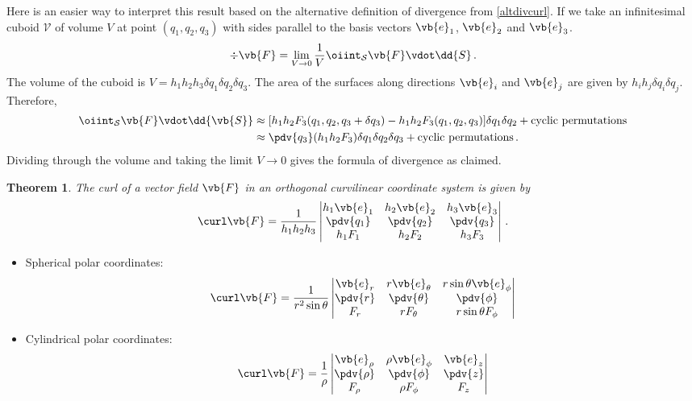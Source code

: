 \documentclass{article}
\theoremstyle{plain}\theoremheaderfont{\normalfont\itshape}\theorembodyfont{\rmfamily}\theoremseparator{.}\newtheorem*{rem}{Remark}\newtheorem*{ex}{Example}\newtheorem*{proof}{Proof}\newtheorem*{altp}{Alternative proof}
\theoremstyle{plain}\theoremheaderfont{\normalfont\bfseries}\theorembodyfont{\rmfamily}\theoremseparator{.}\newtheorem{thm}{Theorem}[section]\newtheorem{lem}[thm]{Lemma}\newtheorem{prop}[thm]{Proposition}\newtheorem*{cor}{Corollary}\newtheorem{defn}[thm]{Definition}\newtheorem{clm}[thm]{Claim}\newtheorem{clminproof}{Claim}
\theoremstyle{break}\theoremheaderfont{\normalfont\itshape}\theorembodyfont{\rmfamily}\theoremseparator{.\medskip}\newtheorem*{proofskip}{Proof}\newtheorem*{exs}{Examples}\newtheorem*{rems}{Remarks}
\theoremstyle{break}\theoremheaderfont{\normalfont\bfseries}\theorembodyfont{\rmfamily}\theoremseparator{.\medskip}\newtheorem{lemskip}[thm]{Lemma}\newtheorem{defnskip}[thm]{Definition}\newtheorem{propskip}[thm]{Proposition}\newtheorem{thmskip}[thm]{Theorem}
\numberwithin{equation}{section}
\begin{document}
	Here is an easier way to interpret this result based on the alternative definition of divergence from \cref{altdivcurl}. If we take an infinitesimal cuboid \(\mathcal{V}\) of volume \(V\) at point \((q_1,q_2,q_3)\) with sides parallel to the basis vectors \(\vb{e}_1\), \(\vb{e}_2\) and \(\vb{e}_3\).
	\[\div\vb{F}=\lim_{V\to 0}\frac{1}{V}\oiint_\mathcal{S}\vb{F}\vdot\dd{S}\,.\]
	The volume of the cuboid is \(V=h_1h_2h_3\delta q_1\delta q_2\delta q_3\). The area of the surfaces along directions \(\vb{e}_i\) and \(\vb{e}_j\) are given by \(h_ih_j\delta q_i\delta q_j\). Therefore,
	\begin{align*}
		\oiint_\mathcal{S}\vb{F}\vdot\dd{\vb{S}}&\approx[h_1h_2F_3(q_1,q_2,q_3+\delta q_3)-h_1h_2F_3(q_1,q_2,q_3)]\delta q_1\delta q_2+\text{cyclic permutations}\\
		&\approx\pdv{q_3}(h_1h_2F_3)\delta q_1\delta q_2\delta q_3 +\text{cyclic permutations}\,.
	\end{align*}
	Dividing through the volume and taking the limit \(V\to 0\) gives the formula of divergence as claimed.
	\begin{thm}
		The curl of a vector field \(\vb{F}\) in an orthogonal curvilinear coordinate system is given by
		\[\curl\vb{F}=\frac{1}{h_1h_2h_3}\begin{vmatrix}
			h_1\vb{e}_1 & h_2\vb{e}_2 & h_3\vb{e}_3 \\
			\pdv{q_1} & \pdv{q_2} & \pdv{q_3} \\
			h_1F_1 & h_2F_2 & h_3F_3
		\end{vmatrix}\,.\]
	\end{thm}
	\begin{itemize}
		\item Spherical polar coordinates:
		\[\curl\vb{F}=\frac{1}{r^2\sin\theta}\begin{vmatrix}
			\vb{e}_r & r\vb{e}_\theta & r\sin\theta\vb{e}_\phi \\
			\pdv{r} & \pdv{\theta} & \pdv{\phi} \\
			F_r & rF_\theta & r\sin\theta F_\phi
		\end{vmatrix}\]
		\item Cylindrical polar coordinates:
		\[\curl\vb{F}=\frac{1}{\rho}\begin{vmatrix}
			\vb{e}_\rho & \rho\vb{e}_\phi & \vb{e}_z \\
			\pdv{\rho} & \pdv{\phi} & \pdv{z} \\
			F_\rho & \rho F_\phi & F_z
		\end{vmatrix}\]
	\end{itemize}
\end{document}
